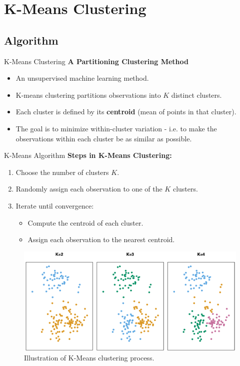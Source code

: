 \documentclass[aspectratio=169,xcolor=dvipsnames]{beamer}
\begin{document}
\section{K-Means Clustering}
\subsection{Algorithm}
\begin{frame}{K-Means Clustering}
    \textbf{A Partitioning Clustering Method}
    \begin{itemize}
    	\setlength\itemsep{0.33cm}
	\item An unsupervised machine learning method.
        \item K-means clustering partitions observations into \( K \) distinct clusters.
        \item Each cluster is defined by its \textbf{centroid} (mean of points in that cluster).
        \item The goal is to minimize within-cluster variation - i.e. to make the observations within each cluster be as similar as possible.
    \end{itemize}
\end{frame}

\begin{frame}{K-Means Algorithm}
    \textbf{Steps in K-Means Clustering:}
    \begin{enumerate}
        \item Choose the number of clusters \( K \).
        \item Randomly assign each observation to one of the \( K \) clusters.
        \item Iterate until convergence:
        \begin{itemize}
            \item Compute the centroid of each cluster.
            \item Assign each observation to the nearest centroid.
        \end{itemize}
    \end{enumerate}
    \begin{figure}
        \centering
        \includegraphics[width=0.55\linewidth]{images/kmeans_algorithm.png}
        \caption{Illustration of K-Means clustering process.}
    \end{figure}
\end{frame}
\end{document}
